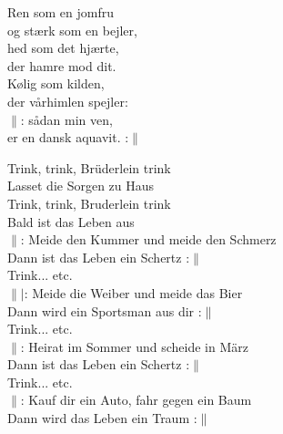 \documentclass[a6paper,10pt]{article}
\begin{document}
\setlength{\oddsidemargin}{-0.37in}
\noindent
\begin{center}
\end{center}
\begin{lyrics}
Ren som en jomfru\\
og stærk som en bejler,\\
hed som det hjærte,\\
der hamre mod dit.
\vspace{5pt}\\
Kølig som kilden,\\
der vårhimlen spejler:\\
$\|$: sådan min ven,\\
er en dansk aquavit. :$\|$ 
\end{lyrics}
\begin{center}
\end{center}
\begin{lyrics}
Trink, trink, Brüderlein trink\\
Lasset die Sorgen zu Haus\\
Trink, trink, Bruderlein trink\\
Bald ist das Leben aus
\vspace{5pt}\\
$\|$: Meide den Kummer und meide den Schmerz\\
Dann ist das Leben ein Schertz :$\|$
\vspace{5pt}\\
Trink... etc.
\vspace{5pt}\\
$\||$: Meide die Weiber und meide das Bier\\
Dann wird ein Sportsman aus dir :$\|$
\vspace{5pt}\\
Trink... etc.
\vspace{5pt}\\
$\|$: Heirat im Sommer und scheide in März\\
Dann ist das Leben ein Schertz :$\|$
\vspace{5pt}\\
Trink... etc.
\vspace{5pt}\\
$\|$: Kauf dir ein Auto, fahr gegen ein Baum\\
Dann wird das Leben ein Traum :$\|$
\end{lyrics}
\setlength{\oddsidemargin}{-0.47in}
\end{document}
